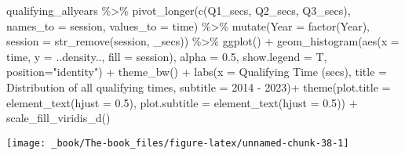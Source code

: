 \documentclass[
]{book}
\newenvironment{Shaded}{\begin{snugshade}}{\end{snugshade}}
\newcommand{\AttributeTok}[1]{\textcolor[rgb]{0.77,0.63,0.00}{#1}}
\newcommand{\FloatTok}[1]{\textcolor[rgb]{0.00,0.00,0.81}{#1}}
\newcommand{\FunctionTok}[1]{\textcolor[rgb]{0.00,0.00,0.00}{#1}}
\newcommand{\NormalTok}[1]{#1}
\newcommand{\SpecialCharTok}[1]{\textcolor[rgb]{0.00,0.00,0.00}{#1}}
\newcommand{\StringTok}[1]{\textcolor[rgb]{0.31,0.60,0.02}{#1}}
\begin{document}
\begin{Shaded}
\begin{Highlighting}[]
\NormalTok{qualifying\_allyears }\SpecialCharTok{\%\textgreater{}\%}
  \FunctionTok{pivot\_longer}\NormalTok{(}\FunctionTok{c}\NormalTok{(}\StringTok{\textquotesingle{}Q1\_secs\textquotesingle{}}\NormalTok{, }\StringTok{\textquotesingle{}Q2\_secs\textquotesingle{}}\NormalTok{, }\StringTok{\textquotesingle{}Q3\_secs\textquotesingle{}}\NormalTok{),}
               \AttributeTok{names\_to =} \StringTok{\textquotesingle{}session\textquotesingle{}}\NormalTok{,}
               \AttributeTok{values\_to =} \StringTok{\textquotesingle{}time\textquotesingle{}}\NormalTok{) }\SpecialCharTok{\%\textgreater{}\%}
  \FunctionTok{mutate}\NormalTok{(}\AttributeTok{Year =} \FunctionTok{factor}\NormalTok{(Year),}
         \AttributeTok{session =} \FunctionTok{str\_remove}\NormalTok{(session, }\StringTok{\textquotesingle{}\_secs\textquotesingle{}}\NormalTok{)) }\SpecialCharTok{\%\textgreater{}\%}
  \FunctionTok{ggplot}\NormalTok{() }\SpecialCharTok{+}
  \FunctionTok{geom\_histogram}\NormalTok{(}\FunctionTok{aes}\NormalTok{(}\AttributeTok{x =}\NormalTok{ time, }\AttributeTok{y =}\NormalTok{ ..density.., }\AttributeTok{fill =}\NormalTok{ session),}
                 \AttributeTok{alpha =} \FloatTok{0.5}\NormalTok{, }\AttributeTok{show.legend =}\NormalTok{ T,}
                 \AttributeTok{position=}\StringTok{"identity"}\NormalTok{) }\SpecialCharTok{+}
  \FunctionTok{theme\_bw}\NormalTok{() }\SpecialCharTok{+}
  \FunctionTok{labs}\NormalTok{(}\AttributeTok{x =} \StringTok{\textquotesingle{}Qualifying Time (secs)\textquotesingle{}}\NormalTok{,}
       \AttributeTok{title =} \StringTok{\textquotesingle{}Distribution of all qualifying times\textquotesingle{}}\NormalTok{,}
       \AttributeTok{subtitle =} \StringTok{\textquotesingle{}2014 {-} 2023\textquotesingle{}}\NormalTok{)}\SpecialCharTok{+}
  \FunctionTok{theme}\NormalTok{(}\AttributeTok{plot.title =} \FunctionTok{element\_text}\NormalTok{(}\AttributeTok{hjust =} \FloatTok{0.5}\NormalTok{),}
        \AttributeTok{plot.subtitle =} \FunctionTok{element\_text}\NormalTok{(}\AttributeTok{hjust =} \FloatTok{0.5}\NormalTok{)) }\SpecialCharTok{+}
  \FunctionTok{scale\_fill\_viridis\_d}\NormalTok{()}
\end{Highlighting}
\end{Shaded}

\begin{center}\texttt{[image: \_book/The-book\_files/figure-latex/unnamed-chunk-38-1]} \end{center}
\end{document}
